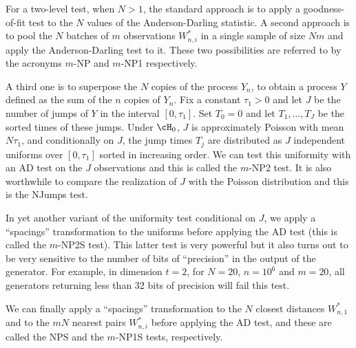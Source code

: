 For a two-level test, when $N>1$, the standard approach is to 
apply a goodness-of-fit test to the $N$ values of the 
Anderson-Darling statistic. A second approach is to pool the $N$ batches
of $m$ observations $W^*_{n,i}$ in a single sample of size $Nm$ and apply
the Anderson-Darling test to it.
These two possibilities are referred to by the acronyms
{$m$-NP} and {$m$-NP1} respectively.

A third one is to superpose the $N$ copies of the process $Y_n$,
to obtain a process $Y$ defined as the sum of the $n$ copies of $Y_n$.
Fix a constant $\tau_1> 0$ and let $J$ be the number of jumps of $Y$ in the 
interval $[0,\tau_1]$. Set $T_0 = 0$
and let $T_1,\dots,T_{J}$ be the sorted times of these jumps. 
Under $\cH_0$, $J$ is approximately Poisson with mean $N \tau_1$,
and conditionally on $J$, the jump times $T_j$ are distributed 
as $J$ independent uniforms over $[0,\tau_1]$ sorted in increasing order.
We can test this uniformity with an AD test on the $J$ observations and
this  is called the {$m$-NP2} test.
It is also worthwhile to compare the realization of $J$ with the Poisson
distribution and this is the {NJumps} test. 

In yet another variant of the uniformity test conditional on $J$,
we apply a ``spacings'' transformation to the uniforms before applying the
AD test (this is called the  {$m$-NP2S} test).  
This latter test is very powerful but it also turns out to be very sensitive 
to the number of bits of ``precision'' in the output of the generator.
For example, in dimension $t=2$, for $N=20$, $n=10^6$ and $m=20$, 
all generators returning less than 32 bits of precision will fail this test.

We can finally apply a ``spacings'' transformation to the $N$ closest distances
$W^*_{n,1}$ and to the $mN$ nearest pairs $W^*_{n,i}$ before applying the
AD test, and these are called the {NPS} and the {$m$-NP1S} tests, respectively.

\iffalse
 A third approach is to pool all the 
jump times of the $N$ copies $Y_n$ that occur in the interval $[0,m]$, 
say $T_1,\dots,T_{n'}$, define $W^*_{i} = 1 -\exp[-N(T_i - T_{i-1})]$ 
for $1\le i\le n'$, where $T_0=0$, and compare the distribution 
of these $W^*_i$ to the uniform one by an Anderson-Darling test.
Here, $n'$ is a Poisson
 random variable with mean $Nm$.
Conditionally on $n'$, the jump times should be distributed as
independent uniforms over $[0,m]$.
\hpierre {Must clarify details here....  This is not in the paper.
   This way, with $n'$ random, the $W^*_i$ are no longer i.i.d. uniform.}
These three possibilities are referred to by the acronyms
$m$-NP, $m$-NP1, and $m$-NP2, respectively.
\fi

